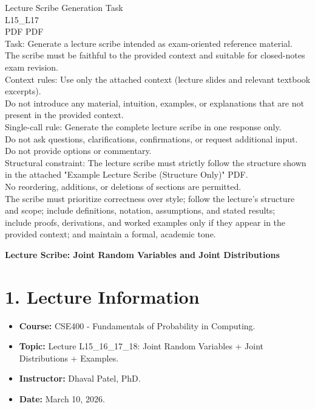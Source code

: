 \documentclass[12pt]{article}
\begin{document}
\noindent
Lecture Scribe Generation Task \\
L15\_L17 \\
PDF PDF \\
Task: Generate a lecture scribe intended as exam-oriented reference material. \\
The scribe must be faithful to the provided context and suitable for closed-notes exam revision. \\
Context rules: Use only the attached context (lecture slides and relevant textbook excerpts). \\
Do not introduce any material, intuition, examples, or explanations that are not present in the provided context. \\
Single-call rule: Generate the complete lecture scribe in one response only. \\
Do not ask questions, clarifications, confirmations, or request additional input. Do not provide options or commentary. \\
Structural constraint: The lecture scribe must strictly follow the structure shown in the attached "Example Lecture Scribe (Structure Only)" PDF. \\
No reordering, additions, or deletions of sections are permitted. \\
The scribe must prioritize correctness over style; follow the lecture's structure and scope; include definitions, notation, assumptions, and stated results; \\
include proofs, derivations, and worked examples only if they appear in the provided context; and maintain a formal, academic tone.

\vspace{1cm}

\noindent
\textbf{Lecture Scribe: Joint Random Variables and Joint Distributions}

\section{1. Lecture Information}
\begin{itemize}[noitemsep]
    \item \textbf{Course:} CSE400 - Fundamentals of Probability in Computing.
    \item \textbf{Topic:} Lecture L15\_16\_17\_18: Joint Random Variables + Joint Distributions + Examples.
    \item \textbf{Instructor:} Dhaval Patel, PhD.
    \item \textbf{Date:} March 10, 2026.
\end{itemize}
\end{document}
